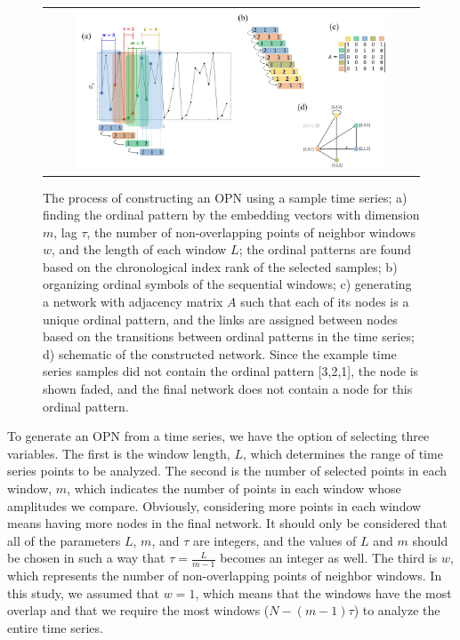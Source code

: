 \documentclass[%
 aip,
 amsmath,amssymb,
 reprint,%
]{revtex4-1}
\begin{document}
\begin{figure}[htbp]
\begin{tabular}{c}
\centerline{\includegraphics[width=0.85\textwidth]{NetworkConstructionChronologicalIndexRanking3.jpg}}
\caption{The process of constructing an OPN using a sample time series; a) finding the ordinal pattern by the embedding vectors with dimension $m$, lag $\tau$, the number of non-overlapping points of neighbor windows $w$, and the length of each window $L$; the ordinal patterns are found based on the chronological index rank of the selected samples; b) organizing ordinal symbols of the sequential windows; c) generating a network with adjacency matrix $A$ such that each of its nodes is a unique ordinal pattern, and the links are assigned between nodes based on the transitions between ordinal patterns in the time series; d) schematic of the constructed network. Since the example time series samples did not contain the ordinal pattern [3,2,1], the node is shown faded, and the final network does not contain a node for this ordinal pattern.}
\label{OPN}
\end{tabular}
\end{figure}

To generate an OPN from a time series, we have the option of selecting three variables. The first is the window length, $L$, which determines the range of time series points to be analyzed. 
The second is the number of selected points in each window, $m$, which indicates the number of points in each window whose amplitudes we compare.
Obviously, considering more points in each window means having more nodes in the final network. 
It should only be considered that all of the parameters $L$, $m$, and $\tau$ are integers, and the values of $L$ and $m$ should be chosen in such a way that $\tau = \frac{L}{m-1}$ becomes an integer as well. 
The third is $w$, which represents the number of non-overlapping points of neighbor windows. In this study, we assumed that $w=1$, which means that the windows have the most overlap and that we require the most windows ($N - (m - 1)\tau$) to analyze the entire time series.
\end{document}
